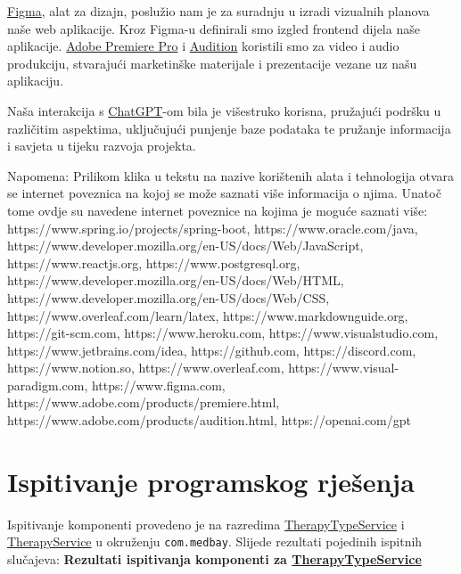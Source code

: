 \href{https://www.figma.com}{Figma}, alat za dizajn, poslužio nam je za suradnju u izradi vizualnih planova naše web aplikacije. Kroz Figma-u definirali smo izgled frontend dijela naše aplikacije. \href{https://www.adobe.com/products/premiere.html}{Adobe Premiere Pro} i \href{https://www.adobe.com/products/audition.html}{Audition} koristili smo za video i audio produkciju, stvarajući marketinške materijale i prezentacije vezane uz našu aplikaciju.

Naša interakcija s \href{https://openai.com/gpt}{ChatGPT}-om bila je višestruko korisna, pružajući podršku u različitim aspektima, uključujući punjenje baze podataka te pružanje informacija i savjeta u tijeku razvoja projekta. 


 		Napomena: Prilikom klika u tekstu na nazive korištenih alata i tehnologija otvara se internet poveznica na kojoj se može saznati više informacija o njima. Unatoč tome ovdje su navedene internet poveznice na kojima je moguće saznati više:  https://www.spring.io/projects/spring-boot, https://www.oracle.com/java,  https://www.developer.mozilla.org/en-US/docs/Web/JavaScript, https://www.reactjs.org, https://www.postgresql.org, https://www.developer.mozilla.org/en-US/docs/Web/HTML, https://www.developer.mozilla.org/en-US/docs/Web/CSS, https://www.overleaf.com/learn/latex,  https://www.markdownguide.org, https://git-scm.com, https://www.heroku.com, https://www.visualstudio.com, https://www.jetbrains.com/idea, https://github.com, https://discord.com, https://www.notion.so, https://www.overleaf.com, https://www.visual-paradigm.com, https://www.figma.com, https://www.adobe.com/products/premiere.html, https://www.adobe.com/products/audition.html, https://openai.com/gpt
			\eject 
		
	
			\section{Ispitivanje programskog rješenja}
			
			Ispitivanje komponenti provedeno je na razredima  \href{https://github.com/Project-MedBay/backend/blob/main/src/test/java/com/medbay/TherapyTypeServiceTest.java}{TherapyTypeService} 
			i \href{https://github.com/Project-MedBay/backend/blob/main/src/test/java/com/medbay/TherapyServiceTest.java}{TherapyService} u okruženju \texttt{com.medbay}. Slijede rezultati pojedinih ispitnih slučajeva:
			\newline \textbf{Rezultati ispitivanja komponenti za \href{https://github.com/Project-MedBay/backend/blob/main/src/test/java/com/medbay/TherapyTypeServiceTest.java}{TherapyTypeService}}

